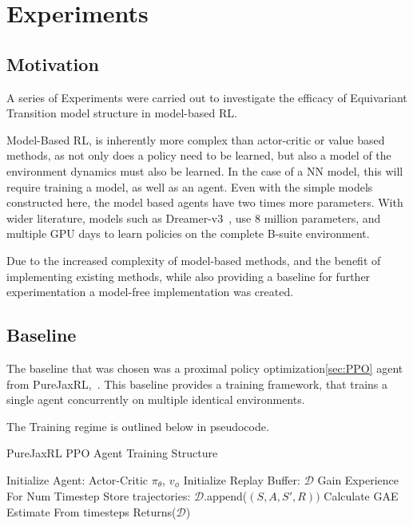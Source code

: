 \chapter{Experiments}
\section{Motivation}
A series of Experiments were carried out to investigate the efficacy of Equivariant Transition model structure in model-based RL.

Model-Based RL, is inherently more complex than actor-critic or value based methods, as not only does a policy need to be learned, but also a model of the environment dynamics must also be learned. In the case of a NN model, this will require training a model, as well as an agent. Even with the simple models constructed here, the model based agents have two times more parameters. With wider literature, models such as Dreamer-v3~\cite{hafner2023mastering}, use 8 million parameters, and multiple GPU days to learn policies on the complete B-suite environment.

Due to the increased complexity of model-based methods, and the benefit of implementing existing methods, while also providing a baseline for further experimentation a model-free implementation was created.

\section{Baseline}\label{sec:baseline}
The baseline that was chosen was a proximal policy optimization\ref{sec:PPO} agent from PureJaxRL,~\cite{lu2022discovered, schulman2015highdimensional}. This baseline provides a training framework, that trains a single agent concurrently on multiple identical environments.

The Training regime is outlined below in pseudocode.
\begin{algorithm}
	\caption{PureJaxRL PPO Agent Training Structure}
	\begin{algorithmic}
		\State Initialize Agent: Actor-Critic $\pi_\theta$, $v_\phi$
		\State Initialize Replay Buffer: $\mathcal{D}$
		\State Gain Experience For Num Timestep
		\State Store trajectories: $\mathcal{D}$.append($(S, A, S', R))$
		\State Calculate GAE Estimate From timesteps
		\EndFor
		\EndFor
		\State Returns($\mathcal{D}$)

	\end{algorithmic}
\end{algorithm}


